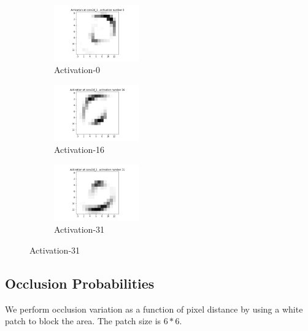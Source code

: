 \begin{figure}[!htbp]
\begin{subfigure}
\centering
\includegraphics[angle=0,width=0.4\textwidth]{assign-2/logs/vis/activation-conv2d_1-0.jpg}
\caption{Activation-0}
\end{subfigure}
\begin{subfigure}
\centering
\includegraphics[angle=0,width=0.4\textwidth]{assign-2/logs/vis/activation-conv2d_1-16.jpg}
\caption{Activation-16}
\end{subfigure}
\begin{subfigure}
\centering
\includegraphics[angle=0,width=0.4\textwidth]{assign-2/logs/vis/activation-conv2d_1-31.jpg}
\caption{Activation-31} 
\end{subfigure}
\end{figure}

\subsection{Occlusion Probabilities}

We perform occlusion variation as a function of pixel distance by using a white patch to block the area. The patch size is $6*6$. \\

